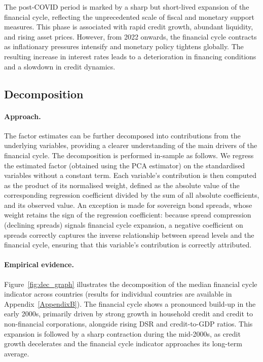The post-COVID period is marked by a sharp but short-lived expansion of the financial cycle, reflecting the unprecedented scale of fiscal and monetary support measures. This phase is associated with rapid credit growth, abundant liquidity, and rising asset prices. However, from 2022 onwards, the financial cycle contracts as inflationary pressures intensify and monetary policy tightens globally. The resulting increase in interest rates leads to a deterioration in financing conditions and a slowdown in credit dynamics.

\subsection{Decomposition}

\paragraph{Approach.}

The factor estimates can be further decomposed into contributions from the underlying variables, providing a clearer understanding of the main drivers of the financial cycle. The decomposition is performed in-sample as follows. We regress the estimated factor (obtained using the PCA estimator) on the standardised variables without a constant term. Each variable's contribution is then computed as the product of its normalised weight, defined as the absolute value of the corresponding regression coefficient divided by the sum of all absolute coefficients, and its observed value. An exception is made for sovereign bond spreads, whose weight retains the sign of the regression coefficient: because spread compression (declining spreads) signals financial cycle expansion, a negative coefficient on spreads correctly captures the inverse relationship between spread levels and the financial cycle, ensuring that this variable's contribution is correctly attributed.

\paragraph{Empirical evidence.}

Figure~\ref{fig:dec_graph} illustrates the decomposition of the median financial cycle indicator across countries (results for individual countries are available in Appendix~\ref{AppendixB}). The financial cycle shows a pronounced build-up in the early 2000s, primarily driven by strong growth in household credit and credit to non-financial corporations, alongside rising DSR and credit-to-GDP ratios. This expansion is followed by a sharp contraction during the mid-2000s, as credit growth decelerates and the financial cycle indicator approaches its long-term average.

